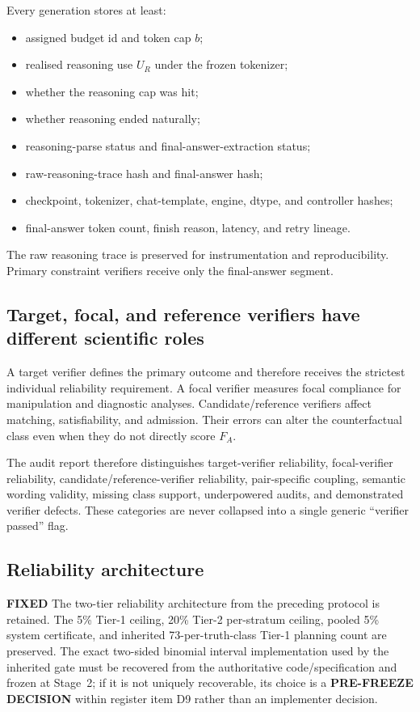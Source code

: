 \documentclass[11pt,a4paper]{article}
\newcommand{\FIXED}{\textbf{FIXED}}
\newcommand{\PFD}{\textbf{PRE-FREEZE DECISION}}
\begin{document}
Every generation stores at least:
\begin{itemize}
\item assigned budget id and token cap $b$;
\item realised reasoning use $U_R$ under the frozen tokenizer;
\item whether the reasoning cap was hit;
\item whether reasoning ended naturally;
\item reasoning-parse status and final-answer-extraction status;
\item raw-reasoning-trace hash and final-answer hash;
\item checkpoint, tokenizer, chat-template, engine, dtype, and controller hashes;
\item final-answer token count, finish reason, latency, and retry lineage.
\end{itemize}
The raw reasoning trace is preserved for instrumentation and reproducibility. Primary constraint verifiers receive only the final-answer segment.

\subsection{Target, focal, and reference verifiers have different scientific roles}

A target verifier defines the primary outcome and therefore receives the strictest individual reliability requirement. A focal verifier measures focal compliance for manipulation and diagnostic analyses. Candidate/reference verifiers affect matching, satisfiability, and admission. Their errors can alter the counterfactual class even when they do not directly score $F_A$.

The audit report therefore distinguishes target-verifier reliability, focal-verifier reliability, candidate/reference-verifier reliability, pair-specific coupling, semantic wording validity, missing class support, underpowered audits, and demonstrated verifier defects. These categories are never collapsed into a single generic ``verifier passed'' flag.

\subsection{Reliability architecture}

\FIXED{} The two-tier reliability architecture from the preceding protocol is retained. The 5\% Tier-1 ceiling, 20\% Tier-2 per-stratum ceiling, pooled 5\% system certificate, and inherited 73-per-truth-class Tier-1 planning count are preserved. The exact two-sided binomial interval implementation used by the inherited gate must be recovered from the authoritative code/specification and frozen at Stage~2; if it is not uniquely recoverable, its choice is a \PFD{} within register item D9 rather than an implementer decision.
\end{document}
